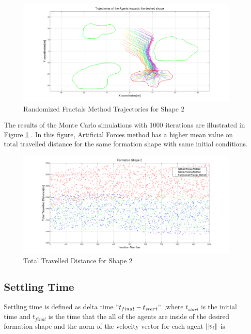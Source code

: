 \begin{figure}[H]
\caption{Randomized Fractals Method Trajectories for Shape 2}
\centerline{\includegraphics[scale = 0.32]{Randomized_Trajectories_2}}
\end{figure} 	
		   
The results of the Monte Carlo simulations with 1000 iterations are illustrated in Figure \ref{total_dist_2} . In this figure, Artificial Forces method has a higher mean value on total travelled distance for the same formation shape with same initial conditions. 

\begin{figure}[H]
\caption{Total Travelled Distance for Shape 2} \label{total_dist_2}
\centerline{\includegraphics[scale = 0.32]{Total_Energy_Shape_2}} 
\end{figure} 	
		   
\subsection{Settling Time} \label{settling_ref}
Settling time is defined as delta time $"t_{final} - t_{start}"$ ,where $t_{start}$ is the initial time and $t_{final}$ is the time that the all of the agents are inside of the desired formation shape and the norm of the velocity vector for each agent $\left\lVert v_i\right\rVert$ is
		
